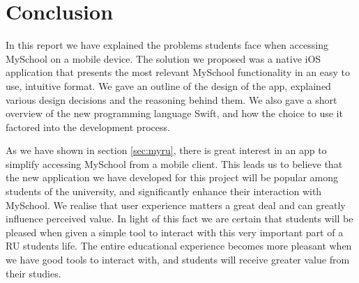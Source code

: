 \documentclass[pdftex, DIV=calc, paper=a4, fontsize=11pt]{scrartcl}	 %
\begin{document}
\section{Conclusion}

In this report we have explained the problems students face when accessing MySchool on a mobile 
device. The solution we proposed was a native iOS application that presents the most relevant 
MySchool functionality in an easy to use, intuitive format. We gave an outline of the design of the
app, explained various design decisions and the reasoning behind them. We also gave a short overview
of the new programming language Swift, and how the choice to use it factored into the development 
process.

As we have shown in section \ref{sec:myru}, there is great interest in an app to simplify accessing
MySchool from a mobile client. This leads us to believe that the new application we have
developed for this project will be popular among students of the university, and significantly
enhance their interaction with MySchool. We realise that user experience matters a great deal and
can greatly influence perceived value. In light of this fact we are certain that students will be pleased
when given a simple tool to interact with this very important part of a RU students life. 
The entire educational experience becomes more pleasant when we have good tools to interact with, and 
students will receive greater value from their studies.

\pagebreak

\end{document}

